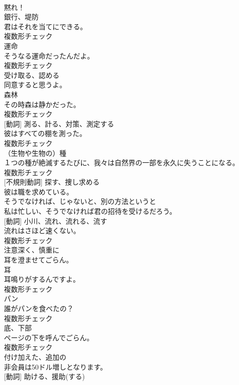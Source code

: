 \documentclass[8pt]{extreport}
\begin{document}
\begin{CJK}{UTF8}{min}
\\	黙れ！	
\\	[名詞]	銀行、堤防	
\\	君はそれを当てにできる。	
\\	複数形チェック
\\	[名詞]	運命	
\\	そうなる運命だったんだよ。	
\\	複数形チェック
\\	[動詞]	受け取る、認める	
\\	同意すると思うよ。	
\\	[名詞]	森林	
\\	その時森は静かだった。	
\\	複数形チェック
\\	[名詞] [動詞]	測る、計る、対策、測定する	
\\	彼はすべての棚を測った。	
\\	複数形チェック
\\	[名詞]	（生物や生物の）種	
\\	１つの種が絶滅するたびに、我々は自然界の一部を永久に失うことになる。	
\\	複数形チェック
\\	[動詞] [不規則動詞]	探す、捜し求める	
\\	彼は職を求めている。	
\\	[副詞]	そうでなければ、じゃないと、別の方法というと	
\\	私は忙しい、そうでなければ君の招待を受けるだろう。	
\\	[名詞] [動詞]	小川、流れ、流れる、流す	
\\	流れはさほど速くない。	
\\	複数形チェック
\\	[副詞]	注意深く、慎重に	
\\	耳を澄ませてごらん。	
\\	[名詞]	耳	
\\	耳鳴りがするんですよ。	
\\	複数形チェック
\\	[名詞]	パン	
\\	誰がパンを食べたの？	
\\	複数形チェック
\\	[名詞]	底、下部	
\\	ページの下を呼んでごらん。	
\\	複数形チェック
\\	[形容詞]	付け加えた、追加の	
\\	非会員は50ドル増しとなります。	
\\	[名詞] [動詞]	助ける、援助(する)	

\end{CJK}
\end{document}
